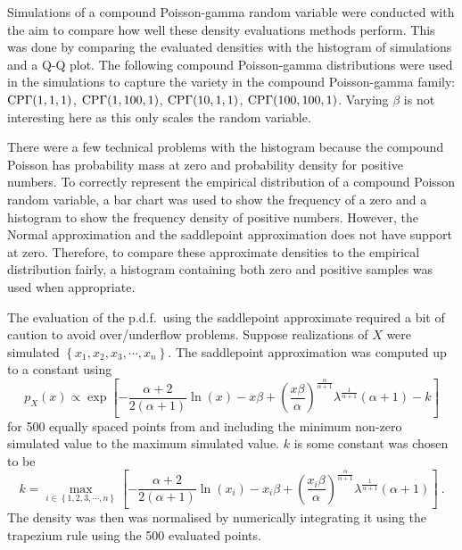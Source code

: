 Simulations of a compound Poisson-gamma random variable were conducted with the aim to compare how well these density evaluations methods perform. This was done by comparing the evaluated densities with the histogram of simulations and a Q-Q plot. The following compound Poisson-gamma distributions were used in the simulations to capture the variety in the compound Poisson-gamma family: $\operatorname{CP\Gamma}(1,1,1)$, $\operatorname{CP\Gamma}(1,100,1)$, $\operatorname{CP\Gamma}(10,1,1)$, $\operatorname{CP\Gamma}(100,100,1)$. Varying $\beta$ is not interesting here as this only scales the random variable.

There were a few technical problems with the histogram because the compound Poisson has probability mass at zero and probability density for positive numbers. To correctly represent the empirical distribution of a compound Poisson random variable, a bar chart was used to show the frequency of a zero and a histogram to show the frequency density of positive numbers. However, the Normal approximation and the saddlepoint approximation does not have support at zero. Therefore, to compare these approximate densities to the empirical distribution fairly, a histogram containing both zero and positive samples was used when appropriate.

The evaluation of the p.d.f.~using the saddlepoint approximate required a bit of caution to avoid over/underflow problems. Suppose realizations of $X$ were simulated $\left\{x_1,x_2,x_3,\cdots,x_n\right\}$. The saddlepoint approximation was computed up to a constant using
\begin{equation}
  p_X(x) \propto
  \exp\left[
    -\frac{\alpha+2}{2(\alpha+1)}
    \ln(x)
    -x\beta
    +\left(
    \frac{x\beta}{\alpha}
    \right)^{\frac{\alpha}{\alpha+1}}\lambda^{\frac{1}{\alpha+1}}(\alpha+1) - k
  \right]
\end{equation}
for 500 equally spaced points from and including the minimum non-zero simulated value to the maximum simulated value. $k$ is some constant was chosen to be
\begin{equation}
  k =
  \max_{i\in\left\{1,2,3,\cdots,n\right\}}
  \left[
    -\frac{\alpha+2}{2(\alpha+1)}
    \ln(x_i)
    -x_i\beta
    +\left(
      \frac{x_i\beta}{\alpha}
    \right)^{\frac{\alpha}{\alpha+1}}\lambda^{\frac{1}{\alpha+1}}(\alpha+1)
  \right]
  \ .
\end{equation}
The density was then was normalised by numerically integrating it using the trapezium rule using the 500 evaluated points.

